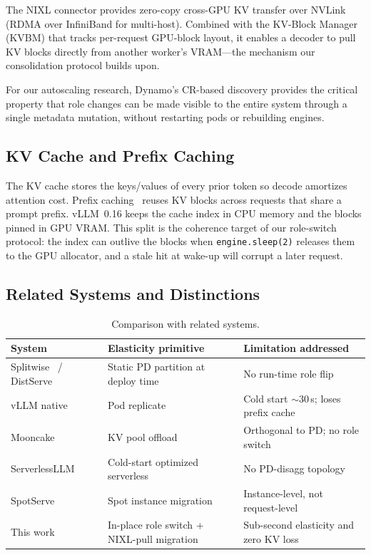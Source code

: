 \documentclass[10pt,twocolumn,letterpaper]{article}
\begin{document}
The NIXL connector provides zero-copy cross-GPU KV transfer over NVLink (RDMA over InfiniBand for multi-host). Combined with the KV-Block Manager (KVBM) that tracks per-request GPU-block layout, it enables a decoder to pull KV blocks directly from another worker's VRAM---the mechanism our consolidation protocol builds upon.

For our autoscaling research, Dynamo's CR-based discovery provides the critical property that role changes can be made visible to the entire system through a single metadata mutation, without restarting pods or rebuilding engines.


\subsection{KV Cache and Prefix Caching}
\label{sec:kv-cache}

The KV cache stores the keys/values of every prior token so decode amortizes attention cost. Prefix caching~\cite{lmcache} reuses KV blocks across requests that share a prompt prefix. vLLM~0.16 keeps the cache index in CPU memory and the blocks pinned in GPU VRAM. This split is the coherence target of our role-switch protocol: the index can outlive the blocks when \texttt{engine.sleep(2)} releases them to the GPU allocator, and a stale hit at wake-up will corrupt a later request.


\subsection{Related Systems and Distinctions}
\label{sec:related}

\begin{table}[t]
\centering
\caption{Comparison with related systems.}
\label{tab:related}
\small
\begin{tabularx}{\linewidth}{@{}lLL@{}}
\toprule
System & Elasticity primitive & Limitation addressed \\
\midrule
Splitwise~\cite{splitwise} / DistServe~\cite{distserve} & Static PD partition at deploy time & No run-time role flip \\
vLLM native~\cite{vllm} & Pod replicate & Cold start ${\sim}$30\,s; loses prefix cache \\
Mooncake~\cite{mooncake} & KV pool offload & Orthogonal to PD; no role switch \\
ServerlessLLM~\cite{serverlessllm} & Cold-start optimized serverless & No PD-disagg topology \\
SpotServe~\cite{spotserve} & Spot instance migration & Instance-level, not request-level \\
This work & In-place role switch + NIXL-pull migration & Sub-second elasticity and zero KV loss \\
\bottomrule
\end{tabularx}
\end{table}
\end{document}
